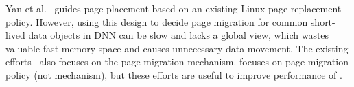 Yan et al.~\cite{Yan:ASPLOS19} guides page placement based on an existing Linux page replacement policy. However, using this design to decide page migration for common short-lived data objects in DNN can be slow and lacks a global view, which wastes valuable fast memory space and causes unnecessary data movement. The existing efforts~\cite{Yan:ASPLOS19, 7446088, Seshadri:2013:RFE:2540708.2540725} also focuses on the page migration mechanism. \name focuses on page migration policy (not mechanism), but these efforts are useful to improve performance of \name.%


\begin{comment}
\textcolor{jie}{
Yan et al.~\cite{Yan:ASPLOS19} guides page placement based on an existing Linux page replacement mechanism. Like Linux, this work uses two FIFO queues (active list and inactive list) to make page migration decisions. However, using this design to decide page migration for common short-lived data objects in DNN can be slow and lacks a global view, which wastes valuable fast memory space and causes unnecessary data movement.}

\textcolor{jie}{
\textcolor{green}{(Can remove page migration mechanism to save space.)}
In terms of page migration mechanism, Yan et al.~\cite{Yan:ASPLOS19} uses multi-threaded migration for single pages and concurrent migration for multiple pages. Wang et al.~\cite{7446088} and Seshadri et al.~\cite{Seshadri:2013:RFE:2540708.2540725} enable fast page migration by enhancing DRAM architecture. \name focuses on page migration policy (not mechanism), but the existing efforts are useful to improve performance of \name.}
\end{comment}





